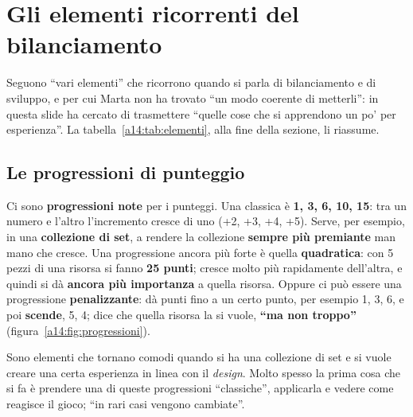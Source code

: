 \section{Gli elementi ricorrenti del bilanciamento}
\label{a14:sec:elementi}

Seguono ``vari elementi'' che ricorrono quando si parla di bilanciamento e di sviluppo, e per
cui Marta non ha trovato ``un modo coerente di metterli'': in questa slide ha cercato di
trasmettere ``quelle cose che si apprendono un po' per esperienza''. La
tabella~\ref{a14:tab:elementi}, alla fine della sezione, li riassume.

\subsection{Le progressioni di punteggio}

Ci sono \textbf{progressioni note} per i punteggi. Una classica è \textbf{1, 3, 6, 10, 15}: tra
un numero e l'altro l'incremento cresce di uno (+2, +3, +4, +5). Serve, per esempio, in una
\textbf{collezione di set}, a rendere la collezione \textbf{sempre più premiante} man mano che
cresce. Una progressione ancora più forte è quella \textbf{quadratica}: con 5 pezzi di una
risorsa si fanno \textbf{25 punti}; cresce molto più rapidamente dell'altra, e quindi si dà
\textbf{ancora più importanza} a quella risorsa. Oppure ci può essere una progressione
\textbf{penalizzante}: dà punti fino a un certo punto, per esempio 1, 3, 6, e poi
\textbf{scende}, 5, 4; dice che quella risorsa la si vuole, \textbf{``ma non troppo''}
(figura~\ref{a14:fig:progressioni}).

Sono elementi che tornano comodi quando si ha una collezione di set e si vuole creare una certa
esperienza in linea con il \emph{design}. Molto spesso la prima cosa che si fa è prendere una
di queste progressioni ``classiche'', applicarla e vedere come reagisce il gioco; ``in rari casi
vengono cambiate''.

